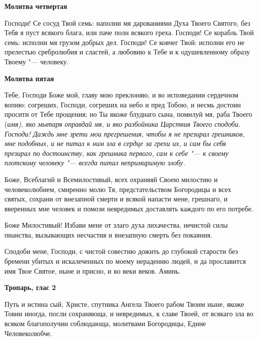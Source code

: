  \bfseries Молитва четвертая\normalfont{}


Господи! Се сосуд Твой семь: наполни мя дарованиями Духа Твоего Святого, без Тебя я пуст всякого блага, или паче полн всякого греха. Господи! Се корабль Твой семь: исполни мя грузом добрых дел. Господи! Се ковчег Твой: исполни его не прелестью сребролюбия и сластей, а любовию к Тебе и к одушевленному образу Твоему "--- человеку.


 \bfseries Молитва пятая\normalfont{}

Тебе, Господи Боже мой, главу мою преклоняю, и во исповедании сердечном вопию: согреших, Господи, согреших на небо и пред Тобою, и несмь достоин просити от Тебе прощения; но Ты якоже блуднаго сына, помилуй мя, раба Твоего (\itshape имя\normalfont{}), яко мытаря оправдай мя, и яко разбойника Царствия Твоего сподоби. Господи! Даждь мне зрети мои прегрешения, чтобы я не презирал грешников, мне подобных, и не питал к ним зла в сердце за грехи их, и сам бы себя презирал по достоинству, как грешника первого, сам к себе "--- к своему плотскому человеку "--- всегда питал непримиримую злобу.
\longpage{}\nopagebreak\medskip\mychapterending

 


Боже, Всеблагий и Всемилостивый, всех охраняяй Своею милостию и человеколюбием, смиренно молю Тя, предстательством Богородицы и всех святых, сохрани от внезапной смерти и всякой напасти мене, грешнаго, и вверенных мне человек и помози невредимых доставлять каждого по его потребе.


Боже Милостивый! Избави мене от злаго духа лихачества, нечистой силы пианства, вызывающих несчастия и внезапную смерть без покаяния.


Сподоби мене, Господи, с чистой совестию дожить до глубокой старости без бремени убитых и искалеченных по моему нерадению людей, и да прославится имя Твое Святое, ныне и присно, и во веки веков. Аминь.
\nopagebreak\bigskip\bigskip\mychapterending

 


\bfseries Тропарь, глас 2\normalfont{}\nopagebreak


Путь и истина сый, Христе, спутника Ангела Твоего рабом Твоим ныне, якоже Товии иногда, посли сохраняюща, и невредимых, к славе Твоей, от всякаго зла во всяком благополучии соблюдающа, молитвами Богородицы, Едине Человеколюбче. 


